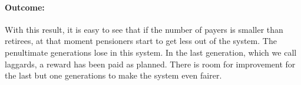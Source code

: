 \paragraph{Outcome:}

\begin{table}[hbt!]
\centering
{}
\end{table}

With this result, it is easy to see that if the number of payers is smaller than retirees, at that moment pensioners start to get less out of the system. The penultimate generations lose in this system. In the last generation, which we call laggards, a reward has been paid as planned. There is room for improvement for the last but one generations to make the system even fairer.


